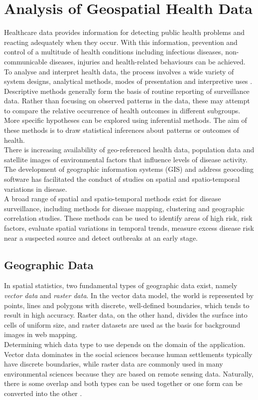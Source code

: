 %

\chapter{Analysis of Geospatial Health Data}
\label{sec:geodata}
Healthcare data provides information for detecting public health problems and reacting adequately when they occur. With this information, prevention and control of a multitude of health conditions including infectious diseases, non-communicable diseases, injuries and health-related behaviours can be achieved. To analyse and interpret health data, the process involves a wide variety of system designs, analytical methods, modes of presentation and interpretive uses \autocite[][]{teutsch2000principles}. Descriptive methods generally form the basis of routine reporting of surveillance data. Rather than focusing on observed patterns in the data, these may attempt to compare the relative occurrence of health outcomes in different subgroups. More specific hypotheses can be explored using inferential methods. The aim of these methods is to draw statistical inferences about patterns or outcomes of health. \\
There is increasing availability of geo-referenced health data, population data and satellite images of environmental factors that influence levels of disease activity. The development of geographic information systems (GIS) and address geocoding software has facilitated the conduct of studies on spatial and spatio-temporal variations in disease. \\
A broad range of spatial and spatio-temporal methods exist for disease surveillance, including methods for disease mapping, clustering and geographic correlation studies. These methods can be used to identify areas of high risk, risk factors, evaluate spatial variations in temporal trends, measure excess disease risk near a suspected source and detect outbreaks at an early stage.
\clearpage
\section{Geographic Data}
In spatial statistics, two fundamental types of geographic data exist, namely \textit{vector data} and \textit{raster data}. In the vector data model, the world is represented by points, lines and polygons with discrete, well-defined boundaries, which tends to result in high accuracy. Raster data, on the other hand, divides the surface into cells of uniform size, and raster datasets are used as the basis for background images in web mapping. \\
Determining which data type to use depends on the domain of the application. Vector data dominates in the social sciences because human settlements typically have discrete boundaries, while raster data are commonly used in many environmental sciences because they are based on remote sensing data. Naturally, there is some overlap and both types can be used together or one form can be converted into the other \autocite[][]{lovelace2019geocomputation}.
